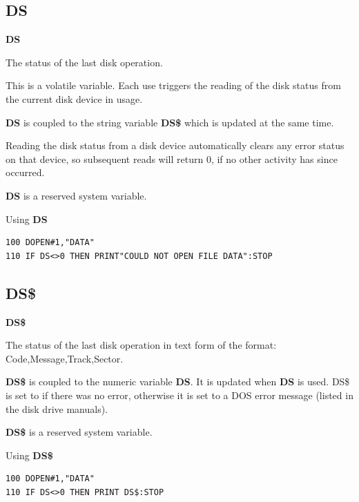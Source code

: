 \subsection{DS}
\begin{description}[leftmargin=2cm,style=nextline]
\item [Format:] {\bf DS}
\item [Usage:]  The status of the last disk operation.

                This is a volatile variable.
                Each use triggers the reading of the disk status
                from the current disk device in usage.

                {\bf DS} is coupled to the string variable {\bf DS\$}
                which is updated at the same time.

                Reading the disk status from a disk device automatically
                clears any error status on that device, so subsequent reads
                will return 0, if no other activity has since occurred.
\item[Remarks:] {\bf DS} is a reserved system variable.

\item [Example:] Using {\bf DS}
\begin{tcolorbox}[colback=black,coltext=white]
\verbatimfont{\codefont}
\begin{verbatim}
100 DOPEN#1,"DATA"
110 IF DS<>0 THEN PRINT"COULD NOT OPEN FILE DATA":STOP
\end{verbatim}
\end{tcolorbox}
\end{description}


\newpage
\subsection{DS\$}
\begin{description}[leftmargin=2cm,style=nextline]
\item [Format:] {\bf DS\$}
\item [Usage:]  The status of the last disk operation
                in text form of the format:
                Code,Message,Track,Sector.

                {\bf DS\$} is coupled to the numeric variable {\bf DS}.
                It is updated when {\bf DS} is used.
                DS\$ is set to  if there was no error, otherwise
                it is set to a DOS error message (listed in the
                disk drive manuals).
\item[Remarks:] {\bf DS\$} is a reserved system variable.

\item [Example:] Using {\bf DS\$}
\begin{tcolorbox}[colback=black,coltext=white]
\verbatimfont{\codefont}
\begin{verbatim}
100 DOPEN#1,"DATA"
110 IF DS<>0 THEN PRINT DS$:STOP
\end{verbatim}
\end{tcolorbox}
\end{description}

